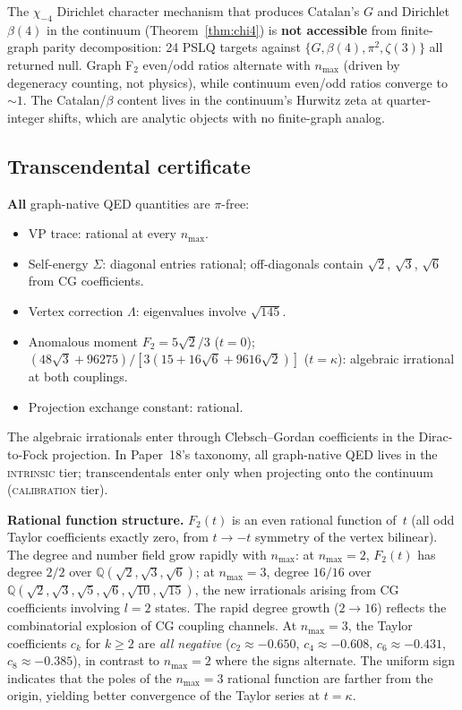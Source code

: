 \documentclass[11pt]{article}
\begin{document}
The $\chi_{-4}$ Dirichlet character mechanism that produces Catalan's
$G$ and Dirichlet $\beta(4)$ in the continuum
(Theorem~\ref{thm:chi4}) is \textbf{not accessible} from
finite-graph parity decomposition: 24 PSLQ targets against
$\{G, \beta(4), \pi^2, \zeta(3)\}$ all returned null.  Graph F$_2$
even/odd ratios alternate with $n_{\max}$ (driven by degeneracy
counting, not physics), while continuum even/odd ratios converge to
${\sim}1$.  The Catalan/$\beta$ content lives in the continuum's
Hurwitz zeta at quarter-integer shifts, which are analytic objects
with no finite-graph analog.

\subsection{Transcendental certificate}

\textbf{All} graph-native QED quantities are $\pi$-free:
\begin{itemize}
\item VP trace: rational at every $n_{\max}$.
\item Self-energy $\Sigma$: diagonal entries rational; off-diagonals
  contain $\sqrt{2}$, $\sqrt{3}$, $\sqrt{6}$ from CG coefficients.
\item Vertex correction $\Lambda$: eigenvalues involve $\sqrt{145}$.
\item Anomalous moment $F_2 = 5\sqrt{2}/3$ ($t = 0$);
  $(48\sqrt{3} + 96275)/[3(15 + 16\sqrt{6} + 9616\sqrt{2})]$
  ($t = \kappa$): algebraic irrational at both couplings.
\item Projection exchange constant: rational.
\end{itemize}
The algebraic irrationals enter through Clebsch--Gordan coefficients
in the Dirac-to-Fock projection.  In Paper~18's taxonomy, all graph-native
QED lives in the \textsc{intrinsic} tier; transcendentals enter only
when projecting onto the continuum (\textsc{calibration} tier).

\textbf{Rational function structure.}
$F_2(t)$ is an even rational function of~$t$ (all odd Taylor coefficients
exactly zero, from $t \to -t$ symmetry of the vertex bilinear).  The
degree and number field grow rapidly with $n_{\max}$:
at $n_{\max} = 2$, $F_2(t)$ has degree $2/2$ over
$\mathbb{Q}(\sqrt{2}, \sqrt{3}, \sqrt{6})$;
at $n_{\max} = 3$, degree $16/16$ over
$\mathbb{Q}(\sqrt{2}, \sqrt{3}, \sqrt{5}, \sqrt{6}, \sqrt{10},
\sqrt{15})$, the new irrationals arising from CG coefficients involving
$l = 2$ states.  The rapid degree growth ($2 \to 16$) reflects the
combinatorial explosion of CG coupling channels.
At $n_{\max} = 3$, the Taylor coefficients $c_k$ for $k \ge 2$ are
\emph{all negative} ($c_2 \approx -0.650$, $c_4 \approx -0.608$,
$c_6 \approx -0.431$, $c_8 \approx -0.385$), in contrast to $n_{\max}
= 2$ where the signs alternate.  The uniform sign indicates that the
poles of the $n_{\max} = 3$ rational function are farther from the
origin, yielding better convergence of the Taylor series at
$t = \kappa$.
\end{document}
